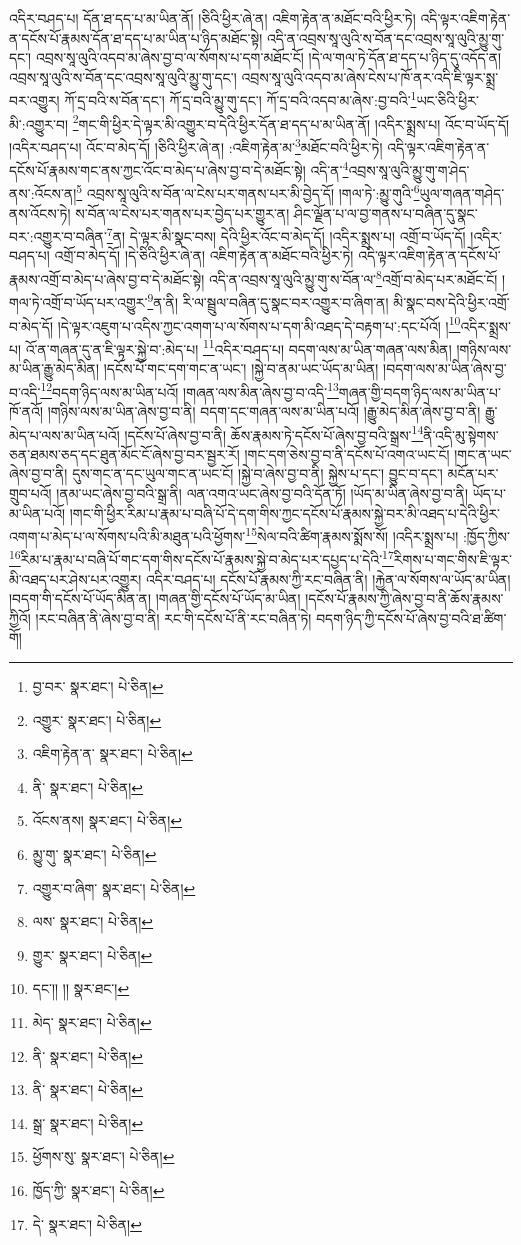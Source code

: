 འདིར་བཤད་པ། དོན་ཐ་དད་པ་མ་ཡིན་ནོ། །ཅིའི་ཕྱིར་ཞེ་ན། འཇིག་རྟེན་ན་མཐོང་བའི་ཕྱིར་ཏེ། འདི་ལྟར་འཇིག་རྟེན་ན་དངོས་པོ་རྣམས་དོན་ཐ་དད་པ་མ་ཡིན་པ་ཉིད་མཐོང་སྟེ། འདི་ན་འབྲས་སཱ་ལུའི་ས་བོན་དང་འབྲས་སཱ་ལུའི་མྱུ་གུ་དང་། འབྲས་སཱ་ལུའི་འདབ་མ་ཞེས་བྱ་བ་ལ་སོགས་པ་དག་མཐོང་ངོ། །དེ་ལ་གལ་ཏེ་དོན་ཐ་དད་པ་ཉིད་དུ་འདོད་ན། འབྲས་སཱ་ལུའི་ས་བོན་དང་འབྲས་སཱ་ལུའི་མྱུ་གུ་དང་། འབྲས་སཱ་ལུའི་འདབ་མ་ཞེས་ངེས་པ་ཁོ་ནར་འདི་ཇི་ལྟར་སྨྲ་བར་འགྱུར། ཀོ་དྲ་བའི་ས་བོན་དང་། ཀོ་དྲ་བའི་མྱུ་གུ་དང་། ཀོ་དྲ་བའི་འདབ་མ་ཞེས་:བྱ་བའི་\footnote{བྱ་བར་  སྣར་ཐང་།  པེ་ཅིན། }ཡང་ཅིའི་ཕྱིར་མི་:འགྱུར་བ། \footnote{འགྱུར་  སྣར་ཐང་།  པེ་ཅིན། }གང་གི་ཕྱིར་དེ་ལྟར་མི་འགྱུར་བ་དེའི་ཕྱིར་དོན་ཐ་དད་པ་མ་ཡིན་ནོ། །འདིར་སྨྲས་པ། འོང་བ་ཡོད་དོ། །འདིར་བཤད་པ། འོང་བ་མེད་དོ། །ཅིའི་ཕྱིར་ཞེ་ན། :འཇིག་རྟེན་མ་\footnote{འཇིག་རྟེན་ན་  སྣར་ཐང་།  པེ་ཅིན། }མཐོང་བའི་ཕྱིར་ཏེ། འདི་ལྟར་འཇིག་རྟེན་ན་དངོས་པོ་རྣམས་གང་ནས་ཀྱང་འོང་བ་མེད་པ་ཞེས་བྱ་བ་དེ་མཐོང་སྟེ། འདི་ན་\footnote{ནི་  སྣར་ཐང་།  པེ་ཅིན། }འབྲས་སཱ་ལུའི་མྱུ་གུ་ག་ཤེད་ནས་:འོངས་ན།\footnote{འོངས་ནས།  སྣར་ཐང་།  པེ་ཅིན། } འབྲས་སཱ་ལུའི་ས་བོན་ལ་ངེས་པར་གནས་པར་མི་བྱེད་དོ། །གལ་ཏེ་:མྱུ་གུའི་\footnote{མྱུ་གུ་  སྣར་ཐང་།  པེ་ཅིན། }ཡུལ་གཞན་གཤེད་ནས་འོངས་ཏེ། ས་བོན་ལ་ངེས་པར་གནས་པར་བྱེད་པར་གྱུར་ན། ཤིང་ལྗོན་པ་ལ་བྱ་གནས་པ་བཞིན་དུ་སྣང་བར་:འགྱུར་བ་བཞིན་\footnote{འགྱུར་བ་ཞིག་  སྣར་ཐང་།  པེ་ཅིན། }ན། དེ་ལྟར་མི་སྣང་བས། དེའི་ཕྱིར་འོང་བ་མེད་དོ། །འདིར་སྨྲས་པ། འགྲོ་བ་ཡོད་དོ། །འདིར་བཤད་པ། འགྲོ་བ་མེད་དོ། །དེ་ཅིའི་ཕྱིར་ཞེ་ན། འཇིག་རྟེན་ན་མཐོང་བའི་ཕྱིར་ཏེ། འདི་ལྟར་འཇིག་རྟེན་ན་དངོས་པོ་རྣམས་འགྲོ་བ་མེད་པ་ཞེས་བྱ་བ་དེ་མཐོང་སྟེ། འདི་ན་འབྲས་སཱ་ལུའི་མྱུ་གུ་ས་བོན་ལ་\footnote{ལས་  སྣར་ཐང་།  པེ་ཅིན། }འགྲོ་བ་མེད་པར་མཐོང་ངོ། །གལ་ཏེ་འགྲོ་བ་ཡོད་པར་འགྱུར་\footnote{གྱུར་  སྣར་ཐང་།  པེ་ཅིན། }ན་ནི། རི་ལ་སྦྲུལ་བཞིན་དུ་སྣང་བར་འགྱུར་བ་ཞིག་ན། མི་སྣང་བས་དེའི་ཕྱིར་འགྲོ་བ་མེད་དོ། །དེ་ལྟར་འཇུག་པ་འདིས་ཀྱང་འགག་པ་ལ་སོགས་པ་དག་མི་འཐད་དེ་བརྟག་པ་:དང་པོའོ། །\footnote{དང་།། །།  སྣར་ཐང་། }འདིར་སྨྲས་པ། འོ་ན་གཞན་དུ་ན་ཇི་ལྟར་སྐྱེ་བ་:མེད་པ། \footnote{མེད་  སྣར་ཐང་།  པེ་ཅིན། }འདིར་བཤད་པ། བདག་ལས་མ་ཡིན་གཞན་ལས་མིན། །གཉིས་ལས་མ་ཡིན་རྒྱུ་མེད་མིན། །དངོས་པོ་གང་དག་གང་ན་ཡང་། །སྐྱེ་བ་ནམ་ཡང་ཡོད་མ་ཡིན། །བདག་ལས་མ་ཡིན་ཞེས་བྱ་བ་འདི་\footnote{ནི་  སྣར་ཐང་།  པེ་ཅིན། }བདག་ཉིད་ལས་མ་ཡིན་པའོ། །གཞན་ལས་མིན་ཞེས་བྱ་བ་འདི་\footnote{ནི་  སྣར་ཐང་།  པེ་ཅིན། }གཞན་གྱི་བདག་ཉིད་ལས་མ་ཡིན་པ་ཁོ་ནའོ། །གཉིས་ལས་མ་ཡིན་ཞེས་བྱ་བ་ནི། བདག་དང་གཞན་ལས་མ་ཡིན་པའོ། །རྒྱུ་མེད་མིན་ཞེས་བྱ་བ་ནི། རྒྱུ་མེད་པ་ལས་མ་ཡིན་པའོ། །དངོས་པོ་ཞེས་བྱ་བ་ནི། ཆོས་རྣམས་ཏེ་དངོས་པོ་ཞེས་བྱ་བའི་སྒྲས་\footnote{སྒྲ་  སྣར་ཐང་།  པེ་ཅིན། }ནི་འདི་མུ་སྟེགས་ཅན་ཐམས་ཅད་དང་ཐུན་མོང་ངོ་ཞེས་བྱ་བར་སྦྱར་རོ། །གང་དག་ཅེས་བྱ་བ་ནི་དངོས་པོ་འགའ་ཡང་ངོ། །གང་ན་ཡང་ཞེས་བྱ་བ་ནི། དུས་གང་ན་དང་ཡུལ་གང་ན་ཡང་ངོ། །སྐྱེ་བ་ཞེས་བྱ་བ་ནི། སྐྱེས་པ་དང་། བྱུང་བ་དང་། མངོན་པར་གྲུབ་པའོ། །ནམ་ཡང་ཞེས་བྱ་བའི་སྒྲ་ནི། ལན་འགའ་ཡང་ཞེས་བྱ་བའི་དོན་ཏོ། །ཡོད་མ་ཡིན་ཞེས་བྱ་བ་ནི། ཡོད་པ་མ་ཡིན་པའོ། །གང་གི་ཕྱིར་རིམ་པ་རྣམ་པ་བཞི་པོ་དེ་དག་གིས་ཀྱང་དངོས་པོ་རྣམས་སྐྱེ་བར་མི་འཐད་པ་དེའི་ཕྱིར་འགག་པ་མེད་པ་ལ་སོགས་པའི་མི་མཐུན་པའི་ཕྱོགས་\footnote{ཕྱོགས་སུ་  སྣར་ཐང་།  པེ་ཅིན། }སེལ་བའི་ཚིག་རྣམས་སྨོས་སོ། །འདིར་སྨྲས་པ། :ཁྱོད་ཀྱིས་\footnote{ཁྱོད་ཀྱི་  སྣར་ཐང་།  པེ་ཅིན། }རིམ་པ་རྣམ་པ་བཞི་པོ་གང་དག་གིས་དངོས་པོ་རྣམས་སྐྱེ་བ་མེད་པར་དཔྱད་པ་དེའི་\footnote{དེ་  སྣར་ཐང་།  པེ་ཅིན། }རིགས་པ་གང་གིས་ཇི་ལྟར་མི་འཐད་པར་ཤེས་པར་འགྱུར། འདིར་བཤད་པ། དངོས་པོ་རྣམས་ཀྱི་རང་བཞིན་ནི། །རྐྱེན་ལ་སོགས་ལ་ཡོད་མ་ཡིན། །བདག་གི་དངོས་པོ་ཡོད་མིན་ན། །གཞན་གྱི་དངོས་པོ་ཡོད་མ་ཡིན། །དངོས་པོ་རྣམས་ཀྱི་ཞེས་བྱ་བ་ནི་ཆོས་རྣམས་ཀྱིའོ། །རང་བཞིན་ནི་ཞེས་བྱ་བ་ནི། རང་གི་དངོས་པོ་ནི་རང་བཞིན་ཏེ། བདག་ཉིད་ཀྱི་དངོས་པོ་ཞེས་བྱ་བའི་ཐ་ཚིག་གོ། 